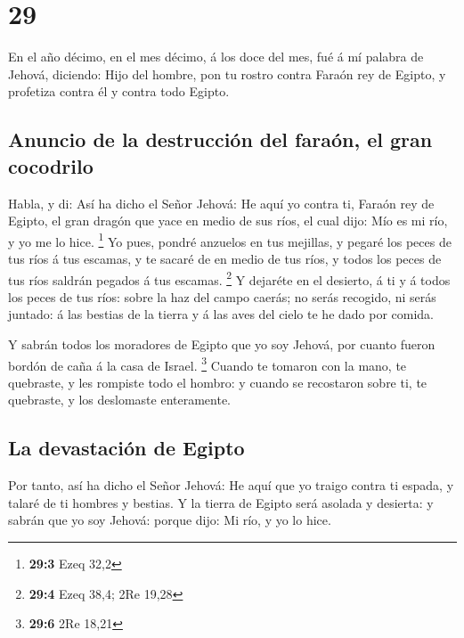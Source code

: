 \hypertarget{section-28}{%
\section{29}\label{section-28}}

 En el año décimo, en el mes décimo, á los doce del mes,
fué á mí palabra de Jehová, diciendo:  Hijo del hombre,
pon tu rostro contra Faraón rey de Egipto, y profetiza contra él y
contra todo Egipto.

\hypertarget{anuncio-de-la-destrucciuxf3n-del-farauxf3n-el-gran-cocodrilo}{%
\subsection{Anuncio de la destrucción del faraón, el gran
cocodrilo}\label{anuncio-de-la-destrucciuxf3n-del-farauxf3n-el-gran-cocodrilo}}

 Habla, y di: Así ha dicho el Señor Jehová: He aquí yo
contra ti, Faraón rey de Egipto, el gran dragón que yace en medio de sus
ríos, el cual dijo: Mío es mi río, y yo me lo hice. \footnote{\textbf{29:3}
  Ezeq 32,2}  Yo pues, pondré anzuelos en tus mejillas, y
pegaré los peces de tus ríos á tus escamas, y te sacaré de en medio de
tus ríos, y todos los peces de tus ríos saldrán pegados á tus escamas.
\footnote{\textbf{29:4} Ezeq 38,4; 2Re 19,28}  Y dejaréte
en el desierto, á ti y á todos los peces de tus ríos: sobre la haz del
campo caerás; no serás recogido, ni serás juntado: á las bestias de la
tierra y á las aves del cielo te he dado por comida.

 Y sabrán todos los moradores de Egipto que yo soy Jehová,
por cuanto fueron bordón de caña á la casa de Israel. \footnote{\textbf{29:6}
  2Re 18,21}  Cuando te tomaron con la mano, te quebraste,
y les rompiste todo el hombro: y cuando se recostaron sobre ti, te
quebraste, y los deslomaste enteramente.

\hypertarget{la-devastaciuxf3n-de-egipto}{%
\subsection{La devastación de
Egipto}\label{la-devastaciuxf3n-de-egipto}}

 Por tanto, así ha dicho el Señor Jehová: He aquí que yo
traigo contra ti espada, y talaré de ti hombres y bestias.
 Y la tierra de Egipto será asolada y desierta: y sabrán
que yo soy Jehová: porque dijo: Mi río, y yo lo hice.

